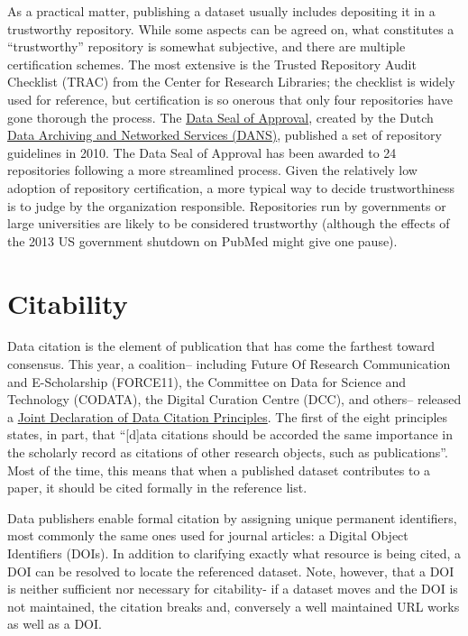 \documentclass[10pt,twocolumn]{article}
\begin{document}
As a practical matter, publishing a dataset usually includes depositing it in a trustworthy repository.
While some aspects can be agreed on, what constitutes a ``trustworthy'' repository is somewhat subjective, and there are multiple certification schemes.
The most extensive is the Trusted Repository Audit Checklist (TRAC)\cite{dale_trustworthy_2007} from the Center for Research Libraries; the checklist is widely used for reference, but certification is so onerous that only four repositories have gone thorough the process. %
The \href{http://datasealofapproval.org/}{Data Seal of Approval}, created by the Dutch \href{http://www.dans.knaw.nl/en}{Data Archiving and Networked Services (DANS)}, published a set of repository guidelines in 2010. 
The Data Seal of Approval has been awarded to 24 repositories following a more streamlined process.
Given the relatively low adoption of repository certification, a more typical way to decide trustworthiness is to judge by the organization responsible.
Repositories run by governments or large universities are likely to be considered trustworthy (although the effects of the 2013 US government shutdown on PubMed\cite{check-hayden_nih_2013} might give one pause). 

\section*{Citability}\label{citability}

Data citation is the element of publication that has come the farthest toward consensus.
This year, a coalition– including Future Of Research Communication and E-Scholarship (FORCE11)\cite{bourne_improving_2012}, the Committee on Data for Science and Technology (CODATA)\cite{codata-icsti_task_group_on_data_citation_standards_and_practices_out_2013}, the Digital Curation Centre (DCC), and others– released a \href{http://www.force11.org/datacitation}{Joint Declaration of Data Citation Principles}.
The first of the eight principles states, in part, that ``[d]ata citations should be accorded the same importance in the scholarly record as citations of other research objects, such as publications''.
Most of the time, this means that when a published dataset contributes to a paper, it should be cited formally in the reference list.
	
Data publishers enable formal citation by assigning unique permanent identifiers, most commonly the same ones used for journal articles: a Digital Object Identifiers (DOIs).
In addition to clarifying exactly what resource is being cited, a DOI can be resolved to locate the referenced dataset.
Note, however, that a DOI is neither sufficient nor necessary for citability- if a dataset moves and the DOI is not maintained, the citation breaks and, conversely a well maintained URL works as well as a DOI.
\end{document}
